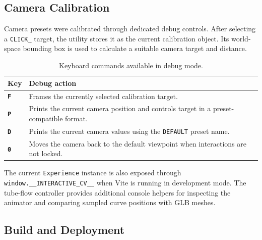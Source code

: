 \documentclass{report}
\begin{document}
\subsection{Camera Calibration}

Camera presets were calibrated through dedicated debug controls. After
selecting a \texttt{CLICK\_} target, the utility stores it as the current
calibration object. Its world-space bounding box is used to calculate a
suitable camera target and distance.

\begin{table}[ht]
    \centering
    \small
    \setlength{\tabcolsep}{7pt}
    \renewcommand{\arraystretch}{1.2}

    \begin{tabularx}{\textwidth}{
        @{}
        >{\bfseries\centering\arraybackslash}p{}
        >{\raggedright\arraybackslash}X
        @{}
    }
        \toprule
        Key & Debug action \\
        \midrule

        \texttt{F}
        &
        Frames the currently selected calibration target.
        \\

        \texttt{P}
        &
        Prints the current camera position and controls target in a
        preset-compatible format.
        \\

        \texttt{D}
        &
        Prints the current camera values using the
        \texttt{DEFAULT} preset name.
        \\

        \texttt{0}
        &
        Moves the camera back to the default viewpoint when interactions
        are not locked.
        \\

        \bottomrule
    \end{tabularx}

    \caption{Keyboard commands available in debug mode.}
    \label{tab:debug-keys}
\end{table}

The current \texttt{Experience} instance is also exposed through
\texttt{window.\_\_INTERACTIVE\_CV\_\_} when Vite is running in
development mode. The tube-flow controller provides additional console
helpers for inspecting the animator and comparing sampled curve
positions with GLB meshes.

\subsection{Build and Deployment}
\end{document}
